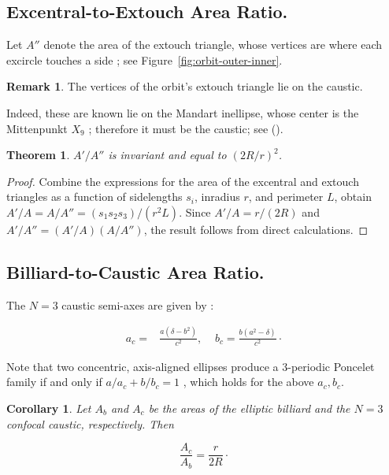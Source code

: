 \documentclass{amsart}
\newtheorem{theorem}{Theorem}
\newtheorem{corollary}{Corollary}
\theoremstyle{definition}
\newtheorem{remark}{Remark}
\begin{document}
\subsection{Excentral-to-Extouch Area Ratio.}

Let $A''$ denote the area of the extouch triangle, whose vertices are where each excircle touches a side \cite[Extouch Triangle]{mw}; see Figure~\ref{fig:orbit-outer-inner}.

\begin{remark}  
The vertices of the orbit's extouch triangle lie on the caustic.
\end{remark}

Indeed, these are known lie on the Mandart inellipse, whose center is the Mittenpunkt $X_9$ \cite[Mandart Inellipse]{mw}; therefore it must be the caustic; see (\cite[PL\#06]{reznik2020-playlist-proofs}).

\begin{theorem}
$A'/A''$ is invariant and equal to $(2R/r)^2$.
\label{thm:area-ratio-outer-inner}
\end{theorem}

\begin{proof}
Combine the expressions for the area of the excentral \cite[Excentral Triangle]{mw} and extouch triangles \cite[Extouch Triangle]{mw} as a function of sidelengths $s_i$, inradius $r$, and perimeter $L$, obtain $A'/A=A/A''=(s_1 s_2 s_3)/(r^2 L)$. Since $A'/A=r/(2R)$  and $A'/A''=(A'/A)(A/A'')$, the result follows from direct calculations.
\end{proof}

\subsection{Billiard-to-Caustic Area Ratio.}

The $N=3$ caustic semi-axes are given by \cite{garcia2019-ellipses,reznik2020-loci}:

\begin{align}
a_c=&\frac{a\left(\delta-{b}^{2}\right)}{c^2},\;\;\;\;
b_c=\frac{b\left({a}^{2}-\delta\right)}{c^2}\cdot
\end{align}

Note that two concentric, axis-aligned ellipses produce a 3-periodic Poncelet family if and only if $a/a_c+b/b_c=1$ \cite{georgiev2012-poncelet}, which holds for the above $a_c,b_c$. 


\begin{corollary}
\label{cor:caustica_billiard}
Let $A_b$ and $A_c$ be the areas of the elliptic billiard and the $N=3$ confocal caustic, respectively. Then

\begin{equation}
\frac{A_c}{A_b}=\frac{r}{2R}\cdot
\label{eqn:caustic-area-ratio}
\end{equation}
\end{corollary}
\end{document}
